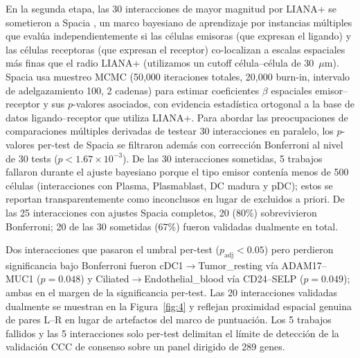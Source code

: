 \documentclass[12pt,a4paper]{article}
\begin{document}
En la segunda etapa, las 30 interacciones de mayor magnitud por LIANA+ se sometieron a Spacia \citep{zhu2024spacia}, un marco bayesiano de aprendizaje por instancias múltiples que evalúa independientemente si las células emisoras (que expresan el ligando) y las células receptoras (que expresan el receptor) co-localizan a escalas espaciales más finas que el radio LIANA+ (utilizamos un cutoff célula--célula de 30~$\mu$m). Spacia usa muestreo MCMC (50,000 iteraciones totales, 20,000 burn-in, intervalo de adelgazamiento 100, 2 cadenas) para estimar coeficientes $\beta$ espaciales emisor--receptor y sus $p$-valores asociados, con evidencia estadística ortogonal a la base de datos ligando--receptor que utiliza LIANA+. Para abordar las preocupaciones de comparaciones múltiples derivadas de testear 30 interacciones en paralelo, los $p$-valores per-test de Spacia se filtraron además con corrección Bonferroni al nivel de 30 tests ($p < 1.67 \times 10^{-3}$). De las 30 interacciones sometidas, 5 trabajos fallaron durante el ajuste bayesiano porque el tipo emisor contenía menos de 500 células (interacciones con Plasma, Plasmablast, DC madura y pDC); estos se reportan transparentemente como inconclusos en lugar de excluidos a priori. De las 25 interacciones con ajustes Spacia completos, 20 (80\%) sobrevivieron Bonferroni; 20 de las 30 sometidas (67\%) fueron validadas dualmente en total.

Dos interacciones que pasaron el umbral per-test ($p_{\text{adj}} < 0.05$) pero perdieron significancia bajo Bonferroni fueron cDC1$\to$Tumor\_resting vía ADAM17--MUC1 ($p = 0.048$) y Ciliated$\to$Endothelial\_blood vía CD24--SELP ($p = 0.049$); ambas en el margen de la significancia per-test. Las 20 interacciones validadas dualmente se muestran en la Figura~\ref{fig:4} y reflejan proximidad espacial genuina de pares L--R en lugar de artefactos del marco de puntuación. Los 5 trabajos fallidos y las 5 interacciones solo per-test delimitan el límite de detección de la validación CCC de consenso sobre un panel dirigido de 289 genes.
\end{document}
